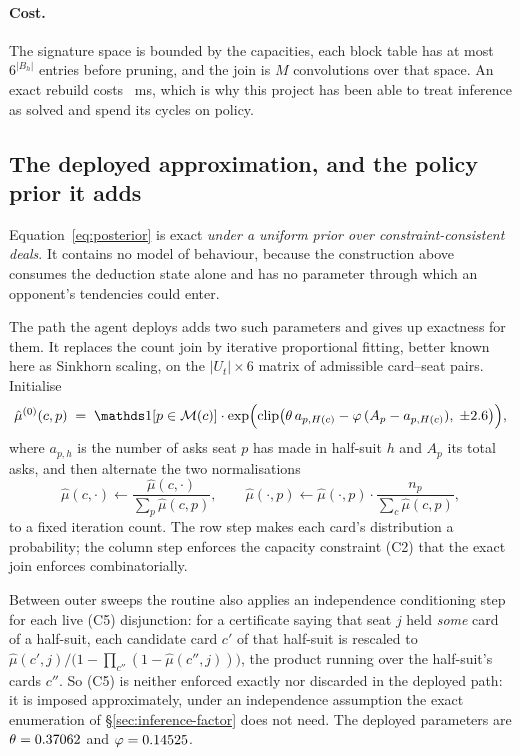 \paragraph{Cost.} The signature space is bounded by the capacities, each block table has at most
$6^{|B_h|}$ entries before pruning, and the join is $M$ convolutions over that space. An exact
rebuild costs \vsixCountCost{}~ms, which is why this project has been able to treat inference as
solved and spend its cycles on policy.

\subsection{The deployed approximation, and the policy prior it adds}
\label{sec:inference-prior}

Equation~\eqref{eq:posterior} is exact \emph{under a uniform prior over constraint-consistent deals}.
It contains no model of behaviour, because the construction above consumes the deduction state alone
and has no parameter through which an opponent's tendencies could enter.

The path the agent deploys adds two such parameters and gives up exactness for them. It replaces
the count join by iterative proportional fitting, better known here as Sinkhorn scaling, on the
$|U_t| \times 6$ matrix of admissible card--seat pairs. Initialise
\begin{equation}
  \hat\mu^{(0)}(c,p) \;=\; \ind\!\left[p \in \mathcal{M}(c)\right] \cdot
  \exp\Bigl(\operatorname{clip}\bigl(\theta\, a_{p,H(c)} - \varphi\, (A_p - a_{p,H(c)}),\; \pm 2.6\bigr)\Bigr),
  \label{eq:prior}
\end{equation}
where $a_{p,h}$ is the number of asks seat $p$ has made in half-suit $h$ and $A_p$ its total asks, and
then alternate the two normalisations
\begin{equation}
  \hat\mu(c,\cdot) \leftarrow \frac{\hat\mu(c,\cdot)}{\sum_{p}\hat\mu(c,p)},
  \qquad
  \hat\mu(\cdot,p) \leftarrow \hat\mu(\cdot,p)\cdot\frac{n_p}{\sum_{c}\hat\mu(c,p)},
  \label{eq:sinkhorn}
\end{equation}
to a fixed iteration count. The row step makes each card's distribution a probability; the column
step enforces the capacity constraint (C2) that the exact join enforces combinatorially.

Between outer sweeps the routine also applies an independence conditioning step for each live (C5)
disjunction: for a certificate saying that seat $j$ held \emph{some} card of a half-suit,
each candidate card $c'$ of that half-suit is rescaled to
$\hat\mu(c',j) \big/ \bigl(1 - \prod_{c''}(1 - \hat\mu(c'',j))\bigr)$, the product running over the
half-suit's cards $c''$.
So (C5) is neither enforced exactly nor discarded in the deployed path: it is imposed approximately,
under an independence assumption the exact enumeration of \S\ref{sec:inference-factor} does not need.
The deployed parameters are $\theta = 0.37062{}$ and $\varphi = 0.14525{}$.

